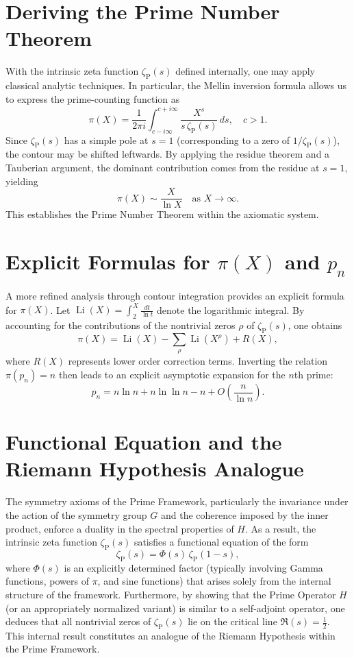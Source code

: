 \documentclass{article}
\begin{document}
\section{Deriving the Prime Number Theorem}
With the intrinsic zeta function \(\zeta_{\mathrm{P}}(s)\) defined internally, one may apply classical analytic techniques. In particular, the Mellin inversion formula allows us to express the prime-counting function as
\[
\pi(X) = \frac{1}{2\pi i} \int_{c-i\infty}^{c+i\infty} \frac{X^s}{s\,\zeta_{\mathrm{P}}(s)}\, ds, \quad c>1.
\]
Since \(\zeta_{\mathrm{P}}(s)\) has a simple pole at \(s=1\) (corresponding to a zero of \(1/\zeta_{\mathrm{P}}(s)\)), the contour may be shifted leftwards. By applying the residue theorem and a Tauberian argument, the dominant contribution comes from the residue at \(s=1\), yielding
\[
\pi(X) \sim \frac{X}{\ln X} \quad \text{as } X \to \infty.
\]
This establishes the Prime Number Theorem within the axiomatic system.

\section{Explicit Formulas for \(\pi(X)\) and \(p_n\)}
A more refined analysis through contour integration provides an explicit formula for \(\pi(X)\). Let \(\operatorname{Li}(X) = \int_2^X \frac{dt}{\ln t}\) denote the logarithmic integral. By accounting for the contributions of the nontrivial zeros \(\rho\) of \(\zeta_{\mathrm{P}}(s)\), one obtains
\[
\pi(X) = \operatorname{Li}(X) - \sum_{\rho} \operatorname{Li}(X^{\rho}) + R(X),
\]
where \(R(X)\) represents lower order correction terms. Inverting the relation \(\pi(p_n)=n\) then leads to an explicit asymptotic expansion for the \(n\)th prime:
\[
p_n = n\ln n + n\ln\ln n - n + O\!\left(\frac{n}{\ln n}\right).
\]

\section{Functional Equation and the Riemann Hypothesis Analogue}
The symmetry axioms of the Prime Framework, particularly the invariance under the action of the symmetry group \(G\) and the coherence imposed by the inner product, enforce a duality in the spectral properties of \(H\). As a result, the intrinsic zeta function \(\zeta_{\mathrm{P}}(s)\) satisfies a functional equation of the form
\[
\zeta_{\mathrm{P}}(s) = \Phi(s)\, \zeta_{\mathrm{P}}(1-s),
\]
where \(\Phi(s)\) is an explicitly determined factor (typically involving Gamma functions, powers of \(\pi\), and sine functions) that arises solely from the internal structure of the framework. Furthermore, by showing that the Prime Operator \(H\) (or an appropriately normalized variant) is similar to a self-adjoint operator, one deduces that all nontrivial zeros of \(\zeta_{\mathrm{P}}(s)\) lie on the critical line \(\Re(s)=\frac{1}{2}\). This internal result constitutes an analogue of the Riemann Hypothesis within the Prime Framework.
\end{document}
